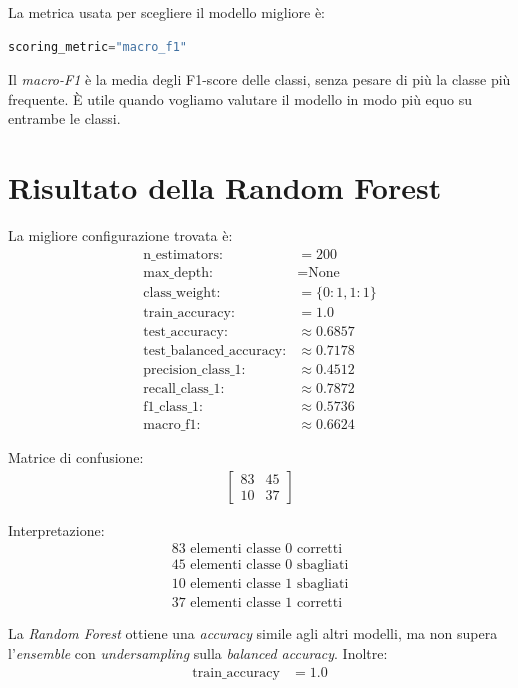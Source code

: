 \documentclass[11pt,a4paper]{article}
\begin{document}
La metrica usata per scegliere il modello migliore è:
\begin{lstlisting}[language=Python]
scoring_metric="macro_f1"
\end{lstlisting}

Il \textit{macro-F1} è la media degli F1-score delle classi, senza pesare di più la classe più frequente. È utile quando vogliamo valutare il modello in modo più equo su entrambe le classi.

\section{Risultato della Random Forest}
La migliore configurazione trovata è:
\begin{align*}
    \text{n\_estimators:} &= 200 \\
    \text{max\_depth:} &= \text{None} \\
    \text{class\_weight:} &= \{0: 1, 1: 1\} \\
    \text{train\_accuracy:} &= 1.0 \\
    \text{test\_accuracy:} &\approx 0.6857 \\
    \text{test\_balanced\_accuracy:} &\approx 0.7178 \\
    \text{precision\_class\_1:} &\approx 0.4512 \\
    \text{recall\_class\_1:} &\approx 0.7872 \\
    \text{f1\_class\_1:} &\approx 0.5736 \\
    \text{macro\_f1:} &\approx 0.6624
\end{align*}

Matrice di confusione:
\begin{align*}
    \begin{bmatrix}
        83 & 45 \\
        10 & 37
    \end{bmatrix}
\end{align*}

Interpretazione:
\begin{align*}
    83 \text{ elementi classe 0 corretti} \\
    45 \text{ elementi classe 0 sbagliati} \\
    10 \text{ elementi classe 1 sbagliati} \\
    37 \text{ elementi classe 1 corretti}
\end{align*}

La \textit{Random Forest} ottiene una \textit{accuracy} simile agli altri modelli, ma non supera l'\textit{ensemble} con \textit{undersampling} sulla \textit{balanced accuracy}. Inoltre:
\begin{align*}
    \text{train\_accuracy} &= 1.0
\end{align*}
\end{document}
